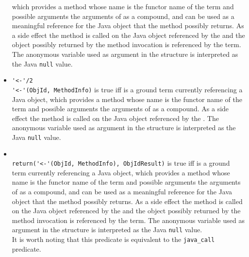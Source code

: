 \begin{itemize}
which provides a method whose name is the functor name of the term
 and possible arguments the arguments of
 as a compound, and  can be used as
a meaningful reference for the Java object that the method
possibly returns.
%
As a side effect the method is called on the Java object
referenced by the  and the object possibly returned by
the method invocation is referenced by the  term.
%
The anonymous variable used as argument in the 
structure is interpreted as the Java \texttt{null} value.\\
%
\item \verb|'<-'/2|\\
\noindent\verb|'<-'(ObjId, MethodInfo)| is true iff  is
a ground term currently referencing a Java object, which provides a
method whose name is the functor name of the term 
and possible arguments the arguments of  as a
compound.
%
As a side effect the method is called on the Java object
referenced by the .
%
The anonymous variable used as argument in the 
structure is interpreted as the Java \texttt{null} value.\\
%
\item {}\\
\noindent\verb|return('<-'(ObjId, MethodInfo), ObjIdResult)| is true
iff  is a ground term currently referencing a Java object,
which provides a method whose name is the functor name of the term
 and possible arguments the arguments of
 as a compound, and  can be used as
a meaningful reference for the Java object that the method
possibly returns.
%
As a side effect the method is called on the Java object
referenced by the  and the object possibly returned by
the method invocation is referenced by the  term.
%
The anonymous variable used as argument in the 
structure is interpreted as the Java \texttt{null} value.\\
%
It is worth noting that this predicate is equivalent to the
\texttt{java\_call} predicate.\\
%
\end{itemize}

